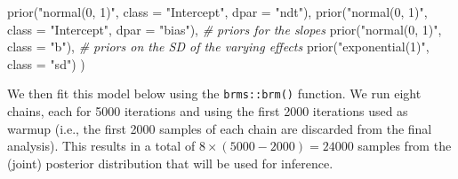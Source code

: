 \documentclass[
  11pt,
  english,
  ,doc,floatsintext]{apa6}
\newenvironment{Shaded}{}{}
\newcommand{\AttributeTok}[1]{\textcolor[rgb]{0.49,0.56,0.16}{#1}}
\newcommand{\CommentTok}[1]{\textcolor[rgb]{0.38,0.63,0.69}{\textit{#1}}}
\newcommand{\FunctionTok}[1]{\textcolor[rgb]{0.02,0.16,0.49}{#1}}
\newcommand{\NormalTok}[1]{#1}
\newcommand{\StringTok}[1]{\textcolor[rgb]{0.25,0.44,0.63}{#1}}
\begin{document}
\begin{Shaded}
\begin{Highlighting}[]
  \FunctionTok{prior}\NormalTok{(}\StringTok{"normal(0, 1)"}\NormalTok{, }\AttributeTok{class =} \StringTok{"Intercept"}\NormalTok{, }\AttributeTok{dpar =} \StringTok{"ndt"}\NormalTok{),}
  \FunctionTok{prior}\NormalTok{(}\StringTok{"normal(0, 1)"}\NormalTok{, }\AttributeTok{class =} \StringTok{"Intercept"}\NormalTok{, }\AttributeTok{dpar =} \StringTok{"bias"}\NormalTok{),}
  \CommentTok{\# priors for the slopes}
  \FunctionTok{prior}\NormalTok{(}\StringTok{"normal(0, 1)"}\NormalTok{, }\AttributeTok{class =} \StringTok{"b"}\NormalTok{),}
  \CommentTok{\# priors on the SD of the varying effects}
  \FunctionTok{prior}\NormalTok{(}\StringTok{"exponential(1)"}\NormalTok{, }\AttributeTok{class =} \StringTok{"sd"}\NormalTok{)}
\NormalTok{  )}
\end{Highlighting}
\end{Shaded}

We then fit this model below using the \texttt{brms::brm()} function. We run eight chains, each for 5000 iterations and using the first 2000 iterations used as warmup (i.e., the first 2000 samples of each chain are discarded from the final analysis). This results in a total of \(8 \times (5000 - 2000) = 24000\) samples from the (joint) posterior distribution that will be used for inference.
\end{document}
